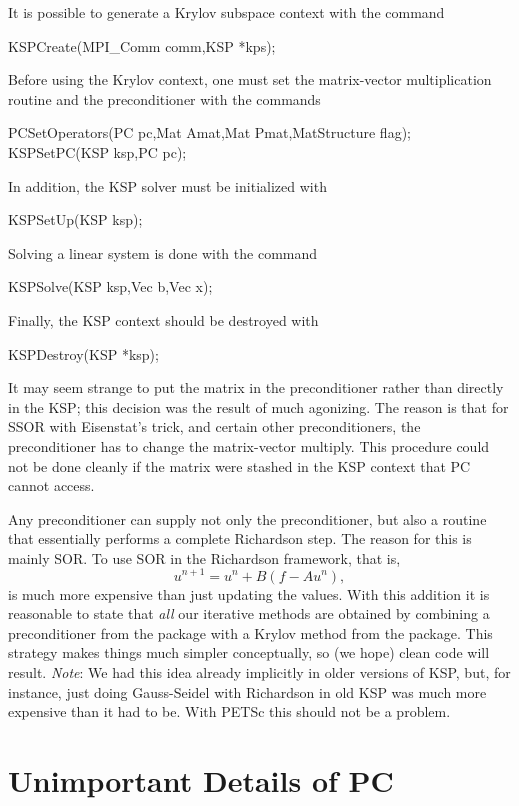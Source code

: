 {{{It is possible to generate a Krylov subspace context with the
command
\begin{tabbing}
  KSPCreate(MPI\_Comm comm,KSP *kps);
\end{tabbing}
Before using the Krylov context, one must set the matrix-vector multiplication routine and
the preconditioner with the
commands
\begin{tabbing}
  PCSetOperators(PC pc,Mat Amat,Mat Pmat,MatStructure flag);\\
  KSPSetPC(KSP ksp,PC pc);
\end{tabbing}
In addition, the KSP solver must be initialized with
\begin{tabbing}
  KSPSetUp(KSP ksp);
\end{tabbing}
Solving a linear system is done with the command
\begin{tabbing}
  KSPSolve(KSP ksp,Vec b,Vec x);
\end{tabbing}
Finally, the KSP context should be destroyed with
\begin{tabbing}
  KSPDestroy(KSP *ksp);
\end{tabbing}

It may seem strange to put the matrix in the preconditioner rather
than directly in the KSP; this decision was the result of much
agonizing. The reason is that for SSOR with Eisenstat's trick, and
certain other preconditioners, the
preconditioner has to change the matrix-vector multiply.  This
procedure could not
be done cleanly if the matrix were stashed in the KSP context that
PC cannot access.

Any preconditioner can supply not
only the preconditioner, but also a routine that essentially performs a
complete Richardson step. The reason for this is mainly SOR. To
use SOR in the Richardson framework, that is,
\[
  u^{n+1} = u^{n} + B(f - A u^{n}),
\]
is much more expensive than just updating the values.
With this addition it is reasonable to state that {\em all} our
iterative methods are obtained by combining a preconditioner from
the  package with a Krylov method from the 
package. This strategy makes things much simpler conceptually, so
(we hope)
clean code will result. {\em Note}: We had this idea already implicitly in
older versions of KSP, but, for instance, just doing Gauss-Seidel
with Richardson in old KSP was much more expensive than it had to be.
With PETSc this should not be a problem.

\section{Unimportant Details of PC}

}}}
